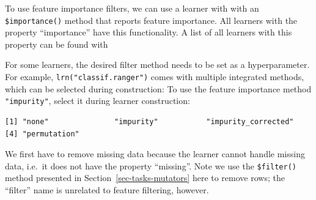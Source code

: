 To use feature importance filters, we can use a learner with with an
\texttt{\$importance()} method that reports feature importance. All
learners with the property ``importance'' have this functionality. A
list of all learners with this property can be found with

\begin{Shaded}
\begin{Highlighting}[]
\NormalTok{(mlr\_learners)[}
   \NormalTok{ x)]}
\end{Highlighting}
\end{Shaded}

For some learners, the desired filter method needs to be set as a
hyperparameter. For example, \texttt{lrn("classif.ranger")} comes with
multiple integrated methods, which can be selected during construction:
To use the feature importance method
\texttt{"impurity"}, select it during learner construction:

\begin{Shaded}
\begin{Highlighting}[]
\NormalTok{(}\NormalTok{)}\SpecialCharTok{$}\SpecialCharTok{$}\SpecialCharTok{$}
\end{Highlighting}
\end{Shaded}

\begin{verbatim}
[1] "none"               "impurity"           "impurity_corrected"
[4] "permutation"       
\end{verbatim}

\begin{Shaded}
\begin{Highlighting}[]
\OtherTok{=} \NormalTok{(}\NormalTok{, } \NormalTok{)}
\end{Highlighting}
\end{Shaded}

We first have to remove missing data because the learner cannot handle
missing data, i.e.~it does not have the property ``missing''. Note we
use the \texttt{\$filter()} method presented in
Section~\ref{sec-tasks-mutators} here to remove rows; the ``filter''
name is unrelated to feature filtering, however.

